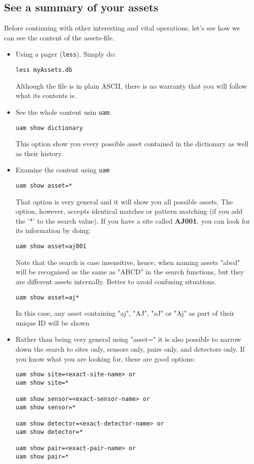 \documentclass[12pt]{amsart}
\begin{document}
\subsection{See a summary of your assets}

Before continuing with other interesting and vital operations, let's see
how we can see the content of the assets-file.

\begin{itemize}
\item Using a pager ({\tt less}). Simply do:

{\tt less myAssets.db}

Although the file is in plain ASCII, there is no warranty that you will
follow what its contents is.

\item See the whole content usin {\tt uam}:

{\tt uam show dictionary}

This option show you every possible asset contained in the dictionary as
well as their history.

\item Examine the content using {\tt uam}

{\tt uam show asset=*}

That option is very general and it will show you all possible assets. The
option, however, accepts identical matches or pattern matching (if you add
the '*' to the search value). If you have a site called {\bf AJ001}, you
can look for its information by doing:

{\tt uam show asset=aj001}

Note that the search is case insensitive, hence, when naming assets
"abcd" will be recognised as the same as "ABCD" in the search functions,
but they are different assets internally. Better to avoid confusing
situations.

{\tt uam show asset=aj*}

In this case, any asset containing "aj", "AJ", "aJ" or "Aj" as part of
their unique ID will be shown

\item Rather than being very general using "asset=" it is also possible to
narrow down the search to sites only, sensors only, pairs only, and
detectors only.  If you know what you are looking for, these are good
options:

\begin{verbatim}
uam show site=<exact-site-name> or
uam show site=*

uam show sensor=<exact-sensor-name> or
uam show sensor=*

uam show detector=<exact-detector-name> or
uam show detector=*

uam show pair=<exact-pair-name> or
uam show pair=*

\end{verbatim}
\end{itemize}
\end{document}
